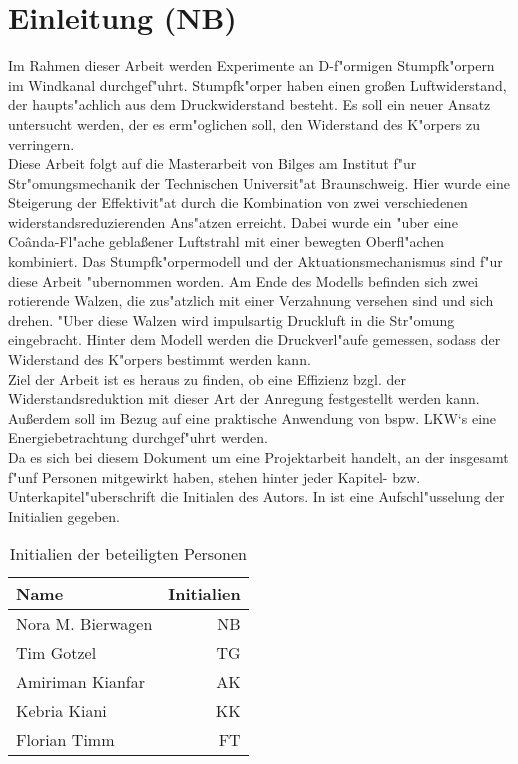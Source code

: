 \chapter{Einleitung (NB)}\label{s:einleitung}
Im Rahmen dieser Arbeit werden Experimente an D-f"ormigen Stumpfk"orpern im Windkanal durchgef"uhrt. Stumpfk"orper haben einen gro\ss{}en Luftwiderstand, der haupts"achlich aus dem Druckwiderstand besteht. Es soll ein neuer Ansatz untersucht werden, der es erm"oglichen soll, den Widerstand des K"orpers zu verringern.\\
Diese Arbeit folgt auf die Masterarbeit \cite{Bilges.2018} von Bilges am Institut f"ur Str"omungsmechanik der Technischen Universit"at Braunschweig. Hier wurde eine Steigerung der Effektivit"at durch die Kombination von zwei verschiedenen widerstandsreduzierenden Ans"atzen erreicht. Dabei wurde ein "uber eine Co\^{a}nda-Fl"ache gebla\ss{}ener Luftstrahl mit einer bewegten Oberfl"achen kombiniert. Das Stumpfk"orpermodell und der Aktuationsmechanismus sind f"ur diese Arbeit "ubernommen worden. Am Ende des Modells befinden sich zwei rotierende Walzen, die zus"atzlich mit einer Verzahnung versehen sind und sich drehen. "Uber diese Walzen wird impulsartig Druckluft in die Str"omung eingebracht. Hinter dem Modell werden die Druckverl"aufe gemessen, sodass der Widerstand des K"orpers bestimmt werden kann.\\
Ziel der Arbeit ist es heraus zu finden, ob eine Effizienz bzgl. der Widerstandsreduktion mit dieser Art der Anregung festgestellt werden kann. Au\ss{}erdem soll im Bezug auf eine praktische Anwendung von bspw. LKW`s eine Energiebetrachtung durchgef"uhrt werden.\\
Da es sich bei diesem Dokument um eine Projektarbeit handelt, an der insgesamt f"unf Personen mitgewirkt haben, stehen hinter jeder Kapitel- bzw. Unterkapitel"uberschrift die Initialen des Autors. In  ist eine Aufschl"usselung der Initialien gegeben.

\begin{table}[h]
	\centering
	\begin{tabular}{lr}
		\toprule
		Name & Initialien\\
		\midrule
		Nora M. Bierwagen & NB\\
		Tim Gotzel & TG\\
		Amiriman Kianfar & AK\\
		Kebria Kiani & KK\\
		Florian Timm & FT\\
		\bottomrule
	\end{tabular}
	\caption{Initialien der beteiligten Personen}
	\label{tab:initialien}
\end{table}

